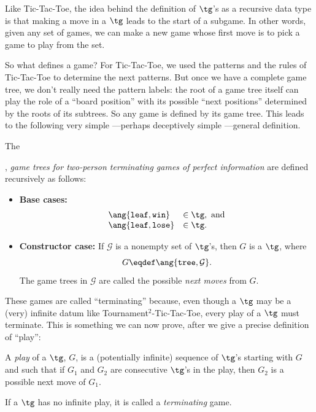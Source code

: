 \begin{definition}
Like Tic-Tac-Toe, the idea behind the definition of $\tg$'s as a
recursive data type is that making a move in a $\tg$ leads to the
start of a subgame.  In other words, given any set of games, we can
make a new game whose first move is to pick a game to play from the set.

So what defines a game?  For Tic-Tac-Toe, we used the patterns and the
rules of Tic-Tac-Toe to determine the next patterns.  But once we have
a complete game tree, we don't really need the pattern labels: the
root of a game tree itself can play the role of a ``board position''
with its possible ``next positions'' determined by the roots of its
subtrees.  So any game is defined by its game tree.  This leads to the
following very simple ---perhaps deceptively simple ---general
definition.

\begin{definition}
The , \emph{game trees for two-person terminating
    games of perfect information} are defined recursively as follows:
\begin{itemize}

\item \textbf{Base cases:}
\[\begin{array}{ll}
\ang{\texttt{leaf},\texttt{win}} & \in \tg, \text{ and}\\
\ang{\texttt{leaf},\texttt{lose}}& \in \tg.
\end{array}\]

\item \textbf{Constructor case:}
If $\mathcal{G}$ is a nonempty set of
$\tg$'s, then $G$ is a $\tg$, where
\[
G \eqdef \ang{\texttt{tree},\mathcal{G}}.
\]
The game trees in $\mathcal{G}$ are called the possible \emph{next moves}
from $G$.
\end{itemize}

\end{definition}

These games are called ``terminating'' because, even though a $\tg$ may be
a (very) infinite datum like Tournament$^2$-Tic-Tac-Toe, every play of a
$\tg$ must terminate.  This is something we can now prove, after we give a
precise definition of ``play'':

\begin{definition}
A \emph{play} of a $\tg$, $G$, is a (potentially infinite) sequence of
$\tg$'s starting with $G$ and such that if $G_1$ and $G_2$ are consecutive
$\tg$'s in the play, then $G_2$ is a possible next move of $G_1$.

If a $\tg$ has no infinite play, it is called a \emph{terminating} game.
\end{definition}


\end{definition}
